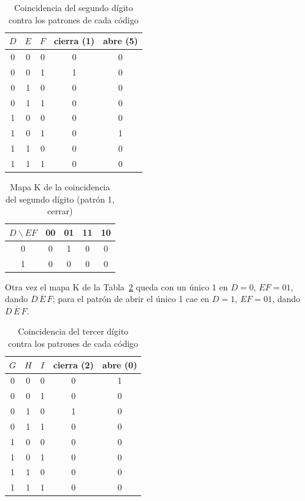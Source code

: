 \documentclass[10pt,conference]{IEEEtran}
\begin{document}
	\begin{table}[H]
		\centering
		\caption{Coincidencia del segundo d\'igito contra los patrones de cada c\'odigo}
		\label{tab:digito2}
		\begin{tabular}{ccc|cc}
			\toprule
			$D$ & $E$ & $F$ & cierra (1) & abre (5)\\
			\midrule
			0&0&0 & 0&0\\
			0&0&1 & 1&0\\
			0&1&0 & 0&0\\
			0&1&1 & 0&0\\
			1&0&0 & 0&0\\
			1&0&1 & 0&1\\
			1&1&0 & 0&0\\
			1&1&1 & 0&0\\
			\bottomrule
		\end{tabular}
	\end{table}
	
	\begin{table}[H]
		\centering
		\caption{Mapa K de la coincidencia del segundo d\'igito (patr\'on 1, cerrar)}
		\label{tab:kmap_digito2}
		\begin{tabular}{c|cccc}
			\toprule
			$D\backslash EF$ & 00 & 01 & 11 & 10\\
			\midrule
			0 & 0 & 1 & 0 & 0\\
			1 & 0 & 0 & 0 & 0\\
			\bottomrule
		\end{tabular}
	\end{table}
	
	Otra vez el mapa K de la Tabla~\ref{tab:kmap_digito2} queda con un \'unico 1 en $D=0$, $EF=01$, dando
	$\overline{D}\,\overline{E}\,F$; para el patr\'on de abrir el \'unico 1 cae en $D=1$, $EF=01$, dando
	$D\,\overline{E}\,F$.
	
	\begin{table}[H]
		\centering
		\caption{Coincidencia del tercer d\'igito contra los patrones de cada c\'odigo}
		\label{tab:digito3}
		\begin{tabular}{ccc|cc}
			\toprule
			$G$ & $H$ & $I$ & cierra (2) & abre (0)\\
			\midrule
			0&0&0 & 0&1\\
			0&0&1 & 0&0\\
			0&1&0 & 1&0\\
			0&1&1 & 0&0\\
			1&0&0 & 0&0\\
			1&0&1 & 0&0\\
			1&1&0 & 0&0\\
			1&1&1 & 0&0\\
			\bottomrule
		\end{tabular}
	\end{table}
	
\end{document}
